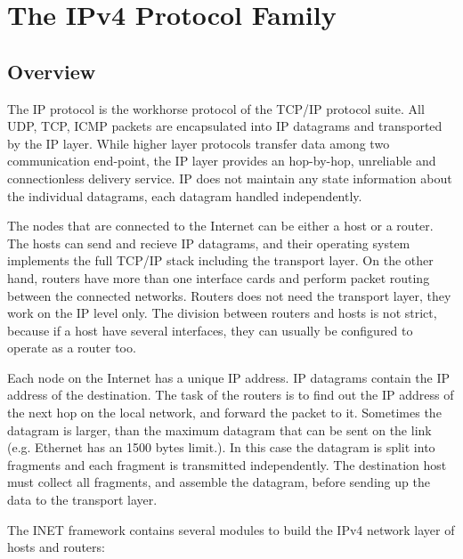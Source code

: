 \chapter{The IPv4 Protocol Family}
\label{cha:ipv4}


\section{Overview}

The IP protocol is the workhorse protocol of the TCP/IP protocol suite.
All UDP, TCP, ICMP packets are encapsulated into IP datagrams and
transported by the IP layer.
While higher layer protocols transfer data among two communication end-point,
the IP layer provides an hop-by-hop, unreliable and connectionless delivery
service. IP does not maintain any state information about the individual
datagrams, each datagram handled independently.

The nodes that are connected to the Internet can be either a host or a router.
The hosts can send and recieve IP datagrams, and their operating system
implements the full TCP/IP stack including the transport layer. On the
other hand, routers have more than one interface cards and perform packet
routing between the connected networks. Routers does not need the
transport layer, they work on the IP level only. The division
between routers and hosts is not strict, because if a host
have several interfaces, they can usually be configured to operate
as a router too.

Each node on the Internet has a unique IP address. IP datagrams contain
the IP address of the destination. The task of the routers is to find
out the IP address of the next hop on the local network, and forward
the packet to it. Sometimes the datagram is larger, than the maximum
datagram that can be sent on the link (e.g. Ethernet has an 1500 bytes limit.).
In this case the datagram is split into fragments and each fragment is
transmitted independently. The destination host must collect all fragments,
and assemble the datagram, before sending up the data to the transport
layer.

The INET framework contains several modules to build the IPv4 network layer of
hosts and routers:

